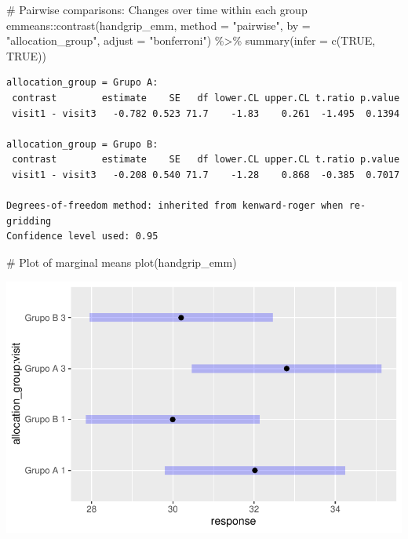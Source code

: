 \documentclass[
  letterpaper,
  DIV=11,
  numbers=noendperiod]{scrartcl}
\newenvironment{Shaded}{\begin{snugshade}}{\end{snugshade}}
\newcommand{\AttributeTok}[1]{\textcolor[rgb]{0.40,0.45,0.13}{#1}}
\newcommand{\CommentTok}[1]{\textcolor[rgb]{0.37,0.37,0.37}{#1}}
\newcommand{\ConstantTok}[1]{\textcolor[rgb]{0.56,0.35,0.01}{#1}}
\newcommand{\FunctionTok}[1]{\textcolor[rgb]{0.28,0.35,0.67}{#1}}
\newcommand{\NormalTok}[1]{\textcolor[rgb]{0.00,0.23,0.31}{#1}}
\newcommand{\SpecialCharTok}[1]{\textcolor[rgb]{0.37,0.37,0.37}{#1}}
\newcommand{\StringTok}[1]{\textcolor[rgb]{0.13,0.47,0.30}{#1}}
\begin{document}
\begin{Shaded}
\begin{Highlighting}[]
\CommentTok{\# Pairwise comparisons: Changes over time within each group}
\NormalTok{emmeans}\SpecialCharTok{::}\FunctionTok{contrast}\NormalTok{(handgrip\_emm, }\AttributeTok{method =} \StringTok{"pairwise"}\NormalTok{, }\AttributeTok{by =} \StringTok{"allocation\_group"}\NormalTok{, }\AttributeTok{adjust =} \StringTok{"bonferroni"}\NormalTok{) }\SpecialCharTok{\%\textgreater{}\%} \FunctionTok{summary}\NormalTok{(}\AttributeTok{infer =} \FunctionTok{c}\NormalTok{(}\ConstantTok{TRUE}\NormalTok{, }\ConstantTok{TRUE}\NormalTok{))}
\end{Highlighting}
\end{Shaded}

\begin{verbatim}
allocation_group = Grupo A:
 contrast        estimate    SE   df lower.CL upper.CL t.ratio p.value
 visit1 - visit3   -0.782 0.523 71.7    -1.83    0.261  -1.495  0.1394

allocation_group = Grupo B:
 contrast        estimate    SE   df lower.CL upper.CL t.ratio p.value
 visit1 - visit3   -0.208 0.540 71.7    -1.28    0.868  -0.385  0.7017

Degrees-of-freedom method: inherited from kenward-roger when re-gridding 
Confidence level used: 0.95 
\end{verbatim}

\begin{Shaded}
\begin{Highlighting}[]
\CommentTok{\# Plot of marginal means}
\FunctionTok{plot}\NormalTok{(handgrip\_emm)}
\end{Highlighting}
\end{Shaded}

\includegraphics{Outcomes_V1V2V3_files/figure-pdf/handgrip_sens_emm-1.pdf}
\end{document}
